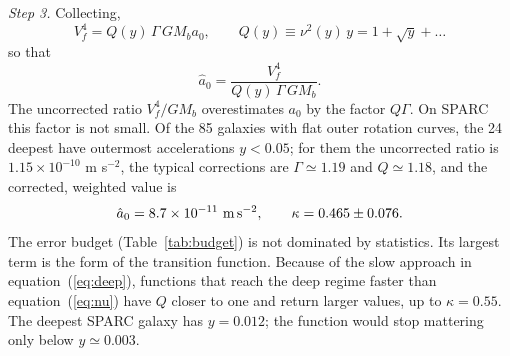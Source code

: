 \documentclass[fleqn,usenatbib]{mnras}
\begin{document}
\emph{Step 3.} Collecting,
\begin{equation}
V_f^4=Q(y)\,\Gamma\,GM_ba_0,\qquad Q(y)\equiv\nu^2(y)\,y=1+\sqrt y+\ldots
\label{eq:btfr}
\end{equation}
so that
\begin{equation}
\hat a_0=\frac{V_f^4}{Q(y)\,\Gamma\,GM_b} .
\label{eq:btfrest}
\end{equation}
The uncorrected ratio $V_f^4/GM_b$ overestimates $a_0$ by the factor $Q\Gamma$. On SPARC this factor is not small. Of the 85 galaxies with flat outer rotation curves, the 24 deepest have outermost accelerations $y<0.05$; for them the uncorrected ratio is $1.15\times10^{-10}$ m s$^{-2}$, the typical corrections are $\Gamma\simeq1.19$ and $Q\simeq1.18$, and the corrected, weighted value is
\begin{equation}
\hat a_0=8.7\times10^{-11}\ {\rm m\,s^{-2}},\qquad \kappa=0.465\pm0.076 .
\label{eq:kappaA}
\end{equation}
The error budget (Table~\ref{tab:budget}) is not dominated by statistics. Its largest term is the form of the transition function. Because of the slow approach in equation~(\ref{eq:deep}), functions that reach the deep regime faster than equation~(\ref{eq:nu}) have $Q$ closer to one and return larger values, up to $\kappa=0.55$. The deepest SPARC galaxy has $y=0.012$; the function would stop mattering only below $y\simeq0.003$.
\end{document}
